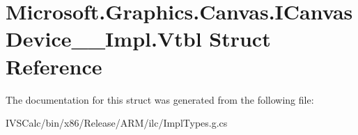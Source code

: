 \hypertarget{struct_microsoft_1_1_graphics_1_1_canvas_1_1_i_canvas_device_____impl_1_1_vtbl}{}\section{Microsoft.\+Graphics.\+Canvas.\+I\+Canvas\+Device\+\_\+\+\_\+\+Impl.\+Vtbl Struct Reference}
\label{struct_microsoft_1_1_graphics_1_1_canvas_1_1_i_canvas_device_____impl_1_1_vtbl}


The documentation for this struct was generated from the following file\+:\begin{DoxyCompactItemize}
\item 
I\+V\+S\+Calc/bin/x86/\+Release/\+A\+R\+M/ilc/Impl\+Types.\+g.\+cs\end{DoxyCompactItemize}
